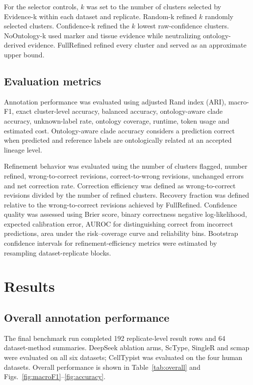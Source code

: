 \documentclass[unnumsec,webpdf,contemporary,large,numbered]{oup-authoring-template}
\begin{document}
For the selector controls, $k$ was set to the number of clusters selected by Evidence-k within each dataset and replicate. Random-k refined $k$ randomly selected clusters. Confidence-k refined the $k$ lowest raw-confidence clusters. NoOntology-k used marker and tissue evidence while neutralizing ontology-derived evidence. FullRefined refined every cluster and served as an approximate upper bound.

\subsection{Evaluation metrics}

Annotation performance was evaluated using adjusted Rand index (ARI), macro-F1, exact cluster-level accuracy, balanced accuracy, ontology-aware clade accuracy, unknown-label rate, ontology coverage, runtime, token usage and estimated cost. Ontology-aware clade accuracy considers a prediction correct when predicted and reference labels are ontologically related at an accepted lineage level.

Refinement behavior was evaluated using the number of clusters flagged, number refined, wrong-to-correct revisions, correct-to-wrong revisions, unchanged errors and net correction rate. Correction efficiency was defined as wrong-to-correct revisions divided by the number of refined clusters. Recovery fraction was defined relative to the wrong-to-correct revisions achieved by FullRefined. Confidence quality was assessed using Brier score, binary correctness negative log-likelihood, expected calibration error, AUROC for distinguishing correct from incorrect predictions, area under the risk--coverage curve and reliability bins. Bootstrap confidence intervals for refinement-efficiency metrics were estimated by resampling dataset-replicate blocks.

\FloatBarrier

\section{Results}

\subsection{Overall annotation performance}

The final benchmark run completed 192 replicate-level result rows and 64 dataset-method summaries. DeepSeek ablation arms, ScType, SingleR and scmap were evaluated on all six datasets; CellTypist was evaluated on the four human datasets. Overall performance is shown in Table~\ref{tab:overall} and Figs.~\ref{fig:macroF1}--\ref{fig:accuracy}.
\end{document}
